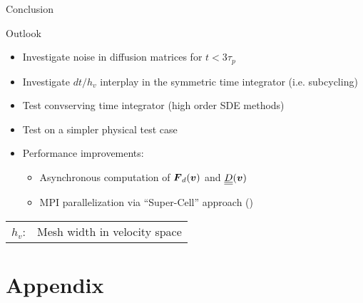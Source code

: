 \begin{frame}[c]{Conclusion}

    \begin{block}{\large Outlook}
        \begin{itemize}
            \itemVspace
            \setlength\itemsep{1.5em}
            \item<1-> Investigate noise in diffusion matrices for $t < 3\tau_p$ %
            \item<2-> Investigate $dt / h_v$ interplay in the symmetric time integrator (i.e. subcycling)
            \item<3-> Test convserving time integrator (high order SDE methods)
            \item<4-> Test on a simpler physical test case
            \item<5-> Performance improvements:
                \begin{itemize}
                    \item<5-> Asynchronous computation of $\boldsymbol{F}_d(\boldsymbol{v})$ and $\underline{\underline{D}}(\boldsymbol{v})$
                    \item<5-> MPI parallelization via ``Super-Cell'' approach (\cite{qiang2000self})
                \end{itemize}
        \end{itemize}
    \end{block}

    \vspace*{\fill}
    \begin{definitionBlock}
         \begin{tabular}{ll}
             $h_v$: & Mesh width in velocity space\\
        \end{tabular}
    \end{definitionBlock}
\end{frame}


\appendix
\section{Appendix}

